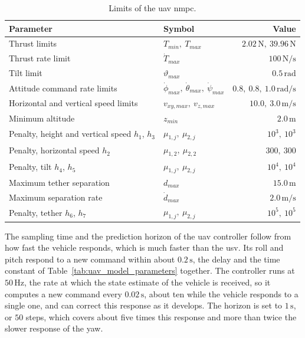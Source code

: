 \begin{table}[htbp]
    \centering
    \caption{Limits of the \gls{uav} \gls{nmpc}.}
    \label{tab:uav_ctrl_limits}
    \begin{tabular*}{0.82\linewidth}{@{\extracolsep{\fill}}llr}
        \toprule
        \textbf{Parameter} & \textbf{Symbol} & \textbf{Value} \\
        \midrule
        Thrust limits & $T_{min},\ T_{max}$ & $2.02\,\text{N},\ 39.96\,\text{N}$ \\
        Thrust rate limit & $\dot T_{max}$ & $100\,\text{N/s}$ \\
        Tilt limit & $\vartheta_{max}$ & $0.5\,\text{rad}$ \\
        Attitude command rate limits & $\dot\phi_{max},\ \dot\theta_{max},\ \dot\psi_{max}$ & $0.8,\ 0.8,\ 1.0\,\text{rad/s}$ \\
        Horizontal and vertical speed limits & $v_{xy,max},\ v_{z,max}$ & $10.0,\ 3.0\,\text{m/s}$ \\
        Minimum altitude & $z_{min}$ & $2.0\,\text{m}$ \\
        Penalty, height and vertical speed $h_1$, $h_3$ & $\mu_{1,j},\ \mu_{2,j}$ & $10^3,\ 10^3$ \\
        Penalty, horizontal speed $h_2$ & $\mu_{1,2},\ \mu_{2,2}$ & $300,\ 300$ \\
        Penalty, tilt $h_4$, $h_5$ & $\mu_{1,j},\ \mu_{2,j}$ & $10^4,\ 10^4$ \\
        Maximum tether separation & $d_{max}$ & $15.0\,\text{m}$ \\
        Maximum separation rate & $\dot d_{max}$ & $2.0\,\text{m/s}$ \\
        Penalty, tether $h_6$, $h_7$ & $\mu_{1,j},\ \mu_{2,j}$ & $10^5,\ 10^5$ \\
        \bottomrule
    \end{tabular*}
\end{table}

The sampling time and the prediction horizon of the \gls{uav} controller follow from how fast the vehicle responds, which is much faster than the \gls{usv}. Its roll and pitch respond to a new command within about $0.2\,\text{s}$, the delay and the time constant of Table~\ref{tab:uav_model_parameters} together. The controller runs at $50\,\text{Hz}$, the rate at which the state estimate of the vehicle is received, so it computes a new command every $0.02\,\text{s}$, about ten while the vehicle responds to a single one, and can correct this response as it develops. The horizon is set to $1\,\text{s}$, or $50$ steps, which covers about five times this response and more than twice the slower response of the yaw.

